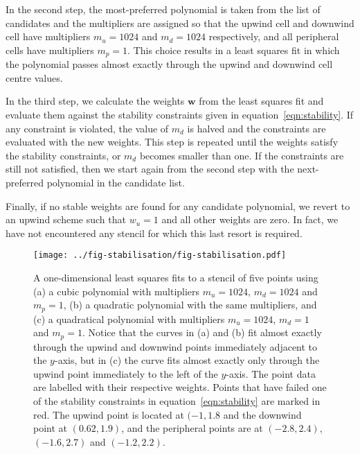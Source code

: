 In the second step, the most-preferred polynomial is taken from the list of candidates and the multipliers are assigned so that the upwind cell and downwind cell have multipliers $m_u = 1024$ and $m_d = 1024$ respectively, and all peripheral cells have multipliers $m_p = 1$.  This choice results in a least squares fit in which the polynomial passes almost exactly through the upwind and downwind cell centre values.

In the third step, we calculate the weights $\mathbf{w}$ from the least squares fit and evaluate them against the stability constraints given in equation~\eqref{eqn:stability}.  If any constraint is violated, the value of $m_d$ is halved and the constraints are evaluated with the new weights.  This step is repeated until the weights satisfy the stability constraints, or $m_d$ becomes smaller than one.  If the constraints are still not satisfied, then we start again from the second step with the next-preferred polynomial in the candidate list.

Finally, if no stable weights are found for any candidate polynomial, we revert to an upwind scheme such that $w_u = 1$ and all other weights are zero.  In fact, we have not encountered any stencil for which this last resort is required.

\begin{figure}
	\centering
	\texttt{[image: ../fig-stabilisation/fig-stabilisation.pdf]}
%
	\caption{A one-dimensional least squares fits to a stencil of five points using (a) a cubic polynomial with multipliers $m_u = 1024$, $m_d = 1024$ and $m_p = 1$, (b) a quadratic polynomial with the same multipliers, and (c) a quadratical polynomial with multipliers $m_u = 1024$, $m_d = 1$ and $m_p = 1$.  Notice that the curves in (a) and (b) fit almost exactly through the upwind and downwind points immediately adjacent to the $y$-axis, but in (c) the curve fits almost exactly only through the upwind point immediately to the left of the $y$-axis.  The point data are labelled with their respective weights.  Points that have failed one of the stability constraints in equation~\eqref{eqn:stability} are marked in red.  The upwind point is located at $(-1, 1.8$ and the downwind point at $(0.62, 1.9)$, and the peripheral points are at $(-2.8, 2.4)$, $(-1.6, 2.7)$ and $(-1.2, 2.2)$.}
	\label{fig:oscillatory1D}
\end{figure}

